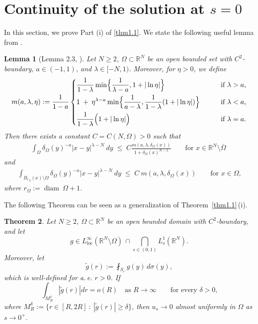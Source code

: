 \documentclass[notitlepage,11pt,reqno]{amsart}
\newtheorem{theorem}{Theorem}[section]
\newtheorem{lemma}[theorem]{Lemma}
\theoremstyle{definition}
\numberwithin{equation}{section}
\newcommand{\loc}{\mathrm{loc}}
\newcommand{\RRN}{\mathds{R}^{N}}
\newcommand{\RR}{\mathds{R}}
\DeclareMathOperator*{\diam}{diam}
\begin{document}
\section{Continuity of the solution at \texorpdfstring{$s=0$}{s =0}}\label{cont at s=0}
In this section, we prove Part (i) of \cref{thm1.1}. We state the following useful lemma from \cite{JSW20}.
\begin{lemma}[Lemma 2.3, \cite{JSW20}]\label{int:la}
	Let $N\geq 2$, $\Omega\subset \RR^N$ be an open bounded set with $C^{2}$-boundary, $a\in(-1,1)$, and $\lambda \in [-N,1)$. Moreover, for $\eta>0$, we define 
$$
m(a,\lambda,\eta):=
\frac{1}{1-a}  \left\{
  \begin{aligned}
&\frac{1}{1-\lambda} \min \Bigl\{\frac{1}{\lambda-a},1+|\ln \eta|\Bigr\} &&\qquad \text{if $\lambda>a$,}\\
&1\:+\: \eta^{\lambda-a} \min \Bigl\{\frac{1}{a-\lambda},\frac{1}{1-\lambda}(1+|\ln \eta|)\Bigr\} &&\qquad \text{if $\lambda<a$,}\\
&\frac{1}{1-\lambda}\Bigl(1+|\ln \eta|\Bigr) && \qquad \text{if $\lambda=a$.}
  \end{aligned}
\right.
$$
Then there exists a constant $C=C(N,\Omega)>0$ such that
\begin{align*}
\int_{\Omega}\delta_{\Omega}(y)^{-a}|x-y|^{\lambda-N}\ dy\;\leq\; C\frac{m(a,\lambda,\delta_{\Omega}(x))}{1+\delta_{\Omega}(x)^{N-\lambda}} \qquad \text{for $x \in \RR^N \setminus \overline \Omega\:$}
\end{align*}
and
\begin{align}\label{eq:(ii)-int-est}
\int_{B_{r_\Omega}(x) \setminus \Omega}\delta_{\Omega}(y)^{-a}|x-y|^{\lambda-N}\ dy
\;\leq\; C\: m(a,\lambda,\delta_{\Omega}(x)) \qquad \text{for $x \in \Omega$,}
\end{align}
where $r_\Omega:= \diam \:\Omega+1$. 
\end{lemma}

The following Theorem can be seen as a generalization of Theorem~\ref{thm1.1}\,(i).

\begin{theorem}\label{thm1.1-section}
  Let $N\geq 2$, $\Omega \subset \RRN$ be an open bounded domain with $C^2$-boundary, and let
  $$
  g \in L^{\infty}_{\loc}(\RR^N\setminus \Omega)\,
  \cap \bigcap \limits_{s \in (0,1)}L^1_s(\RR^N).
  $$
  Moreover, let
  $$
  \tilde g(r):= \fint_{S_r}g(y)\,d\sigma(y),
  $$
  which is well-defined for a.\,e. $r>0$. If 
  \begin{equation}
   \label{assumption-g-tilde} 
  \int_{M_R^\delta} |\tilde g(r)|dr = o(R) \quad \text{as $R \to \infty$}\qquad \text{for every $\delta>0$,} 
  \end{equation}
 where $M_R^\delta := \{r \in [R,2R]\::\: |\tilde g(r)|\ge \delta\}$, then  
 $u_s \to 0$ almost uniformly in $\Omega$ as $s \to 0^+.$
\end{theorem}
\end{document}
